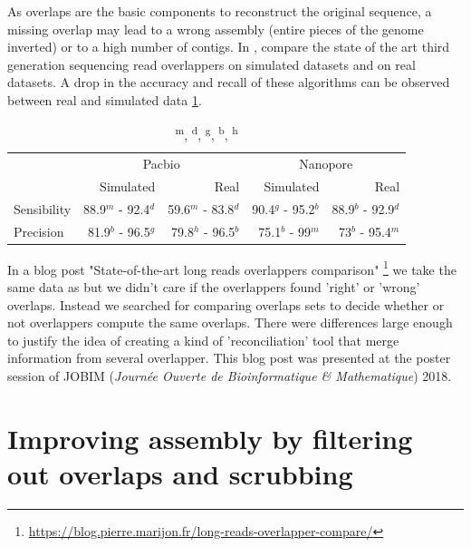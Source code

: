 \documentclass[main.tex]{subfiles}
\begin{document}
As overlaps are the basic components to reconstruct the original sequence, a missing overlap may lead to a wrong assembly (entire pieces of the genome inverted) or to a high number of contigs. In \cite{ovl_bench}, \citeauthor{ovl_bench} compare the state of the art third generation sequencing read overlappers on simulated datasets and on real datasets. A drop in the accuracy and recall of these algorithms can be observed between real and simulated data \ref{preassembly:tab:ovl_result}.
\begin{table}[ht]
    \centering
    \begin{tabular}{l|rr|rr}
                & \multicolumn{2}{c}{Pacbio}                & \multicolumn{2}{c}{Nanopore}              \\ 
                & Simulated           & Real                & Simulated         & Real                  \\ \hline
    Sensibility & 88.9$^m$ - 92.4$^d$ & 59.6$^m$ - 83.8$^d$ & 90.4$^g$ - 95.2$^b$ & 88.9$^b$ - 92.9$^d$ \\
    Precision   & 81.9$^b$ - 96.5$^g$ & 79.8$^h$ - 96.5$^b$ & 75.1$^b$ - 99$^m$   & 73$^b$ - 95.4$^m$   \\
    \end{tabular}
    \caption{\textsuperscript{m}, \textsuperscript{d}, \textsuperscript{g}, \textsuperscript{b}, \textsuperscript{h}\mhap}
    \label{preassembly:tab:ovl_result}
\end{table}

In a blog post "State-of-the-art long reads overlappers comparison" \footnote{\url{https://blog.pierre.marijon.fr/long-reads-overlapper-compare/}} we take the same data as \cite{ovl_bench} but we didn't care if the overlappers found 'right' or 'wrong' overlaps. Instead we searched for comparing overlaps sets to decide whether or not overlappers compute the same overlaps. There were differences large enough to justify the idea of creating a kind of 'reconciliation' tool that merge information from several overlapper. This blog post was presented at the poster session of JOBIM (\textit{Journée Ouverte de Bioinformatique \& Mathematique}) 2018.



\section{Improving assembly by filtering out overlaps and scrubbing}
\end{document}
